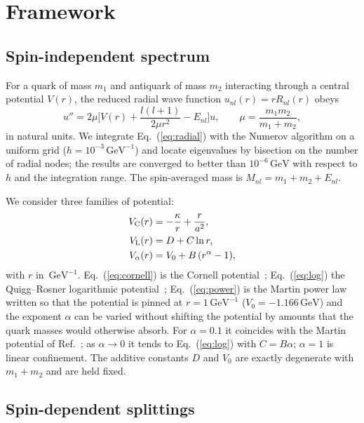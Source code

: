 \documentclass[10pt,twocolumn]{article}
\newcommand{\GeV}{\,\mathrm{GeV}}
\begin{document}
\section{Framework}
\label{sec:framework}

\subsection{Spin-independent spectrum}

For a quark of mass $m_1$ and antiquark of mass $m_2$ interacting through a central potential $V(r)$, the reduced radial wave function $u_{nl}(r)=rR_{nl}(r)$ obeys
\begin{equation}
  u'' = 2\mu\Big[V(r)+\frac{l(l+1)}{2\mu r^2}-E_{nl}\Big]u ,\qquad \mu=\frac{m_1m_2}{m_1+m_2},
  \label{eq:radial}
\end{equation}
in natural units.
We integrate Eq.~(\ref{eq:radial}) with the Numerov algorithm on a uniform grid ($h=10^{-3}\GeV^{-1}$) and locate eigenvalues by bisection on the number of radial nodes; the results are converged to better than $10^{-6}\GeV$ with respect to $h$ and the integration range.
The spin-averaged mass is $M_{nl}=m_1+m_2+E_{nl}$.

We consider three families of potential:
\begin{align}
  V_{\rm C}(r) &= -\frac{\kappa}{r}+\frac{r}{a^2}, \label{eq:cornell}\\
  V_{\rm L}(r) &= D + C\ln r, \label{eq:log}\\
  V_{\alpha}(r) &= V_0 + B\,(r^{\alpha}-1), \label{eq:power}
\end{align}
with $r$ in $\GeV^{-1}$.
Eq.~(\ref{eq:cornell}) is the Cornell potential~\cite{Eichten1978}; Eq.~(\ref{eq:log}) the Quigg--Rosner logarithmic potential~\cite{Quigg1977}; Eq.~(\ref{eq:power}) is the Martin power law~\cite{Martin1980} written so that the potential is pinned at $r=1\GeV^{-1}$ ($V_0=-1.166\GeV$) and the exponent $\alpha$ can be varied without shifting the potential by amounts that the quark masses would otherwise absorb.
For $\alpha=0.1$ it coincides with the Martin potential of Ref.~\cite{Eichten1994}; as $\alpha\to0$ it tends to Eq.~(\ref{eq:log}) with $C=B\alpha$; $\alpha=1$ is linear confinement.
The additive constants $D$ and $V_0$ are exactly degenerate with $m_1+m_2$ and are held fixed.

\subsection{Spin-dependent splittings}
\end{document}
